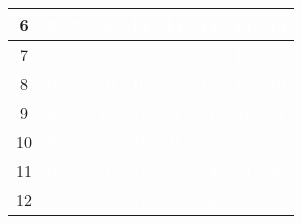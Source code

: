 \documentclass{article}
\begin{document}
\begin{center}
\begin{tabular}{|c|c|c|c|c|c|c|c|c|}
6 & \cellcolor{rojo}\textcolor{white}{0} & \cellcolor{verde}\textcolor{white}{7} & \cellcolor{verde}\textcolor{white}{9} & \cellcolor{verde}\textcolor{white}{14} & \cellcolor{rojo}\textcolor{white}{14} & \cellcolor{rojo}\textcolor{white}{14} & \cellcolor{rojo}\textcolor{white}{14} & \cellcolor{rojo}\textcolor{white}{14} \\ \hline
7 & \cellcolor{rojo}\textcolor{white}{0} & \cellcolor{verde}\textcolor{white}{7} & \cellcolor{verde}\textcolor{white}{16} & \cellcolor{rojo}\textcolor{white}{16} & \cellcolor{rojo}\textcolor{white}{16} & \cellcolor{rojo}\textcolor{white}{16} & \cellcolor{rojo}\textcolor{white}{16} & \cellcolor{verde}\textcolor{white}{17} \\ \hline
8 & \cellcolor{rojo}\textcolor{white}{0} & \cellcolor{verde}\textcolor{white}{7} & \cellcolor{verde}\textcolor{white}{16} & \cellcolor{rojo}\textcolor{white}{16} & \cellcolor{verde}\textcolor{white}{17} & \cellcolor{rojo}\textcolor{white}{17} & \cellcolor{verde}\textcolor{white}{18} & \cellcolor{verde}\textcolor{white}{19} \\ \hline
9 & \cellcolor{rojo}\textcolor{white}{0} & \cellcolor{verde}\textcolor{white}{7} & \cellcolor{verde}\textcolor{white}{16} & \cellcolor{verde}\textcolor{white}{21} & \cellcolor{rojo}\textcolor{white}{21} & \cellcolor{rojo}\textcolor{white}{21} & \cellcolor{rojo}\textcolor{white}{21} & \cellcolor{rojo}\textcolor{white}{21} \\ \hline
10 & \cellcolor{rojo}\textcolor{white}{0} & \cellcolor{verde}\textcolor{white}{7} & \cellcolor{verde}\textcolor{white}{16} & \cellcolor{verde}\textcolor{white}{21} & \cellcolor{rojo}\textcolor{white}{21} & \cellcolor{rojo}\textcolor{white}{21} & \cellcolor{verde}\textcolor{white}{22} & \cellcolor{verde}\textcolor{white}{24} \\ \hline
11 & \cellcolor{rojo}\textcolor{white}{0} & \cellcolor{verde}\textcolor{white}{7} & \cellcolor{verde}\textcolor{white}{16} & \cellcolor{verde}\textcolor{white}{21} & \cellcolor{verde}\textcolor{white}{24} & \cellcolor{rojo}\textcolor{white}{24} & \cellcolor{rojo}\textcolor{white}{24} & \cellcolor{verde}\textcolor{white}{26} \\ \hline
12 & \cellcolor{rojo}\textcolor{white}{0} & \cellcolor{verde}\textcolor{white}{7} & \cellcolor{verde}\textcolor{white}{16} & \cellcolor{verde}\textcolor{white}{21} & \cellcolor{verde}\textcolor{white}{26} & \cellcolor{rojo}\textcolor{white}{26} & \cellcolor{verde}\textcolor{white}{27} & \cellcolor{verde}\textcolor{white}{28} \\ \hline

\end{tabular}
\end{center}
\end{document}
